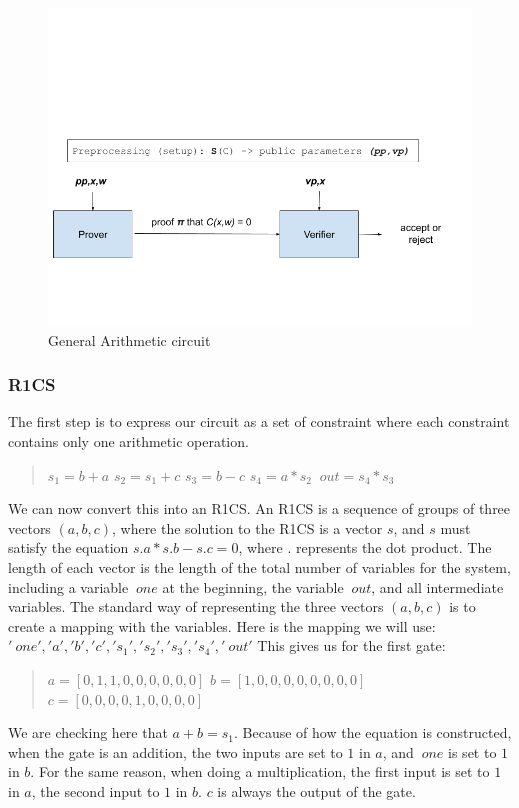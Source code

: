 \begin{figure}[H]
   \centering
   \includegraphics[width=130mm]{ArithmeticCircuit.png}
   \caption{General Arithmetic circuit}
   \label{overflow}
   \end{figure}

   \subsubsection{R1CS}
   The first step is to express our circuit as a set of constraint where each constraint contains only one arithmetic operation.
   \begin{quote}
   $s_1 = b+a$
   $s_2 = s_1+c$
   $s_3 = b-c$
   $s_4 = a * s_2$
   $~out = s_4 * s_3$
   \end{quote}

   We can now convert this into an R1CS.
   An R1CS is a sequence of groups of three vectors $(a, b, c)$, where the solution to the R1CS is a vector $s$, and $s$ must satisfy the equation $s . a * s . b - s . c = 0$, where $.$ represents the dot product.
   The length of each vector is the length of the total number of variables for the system, including a variable $~one$ at the beginning, the variable $~out$, and all intermediate variables.
   The standard way of representing the three vectors $(a, b, c)$ is to create a mapping with the variables.
   Here is the mapping we will use:
   $'~one', 'a','b','c','s_1','s_2','s_3','s_4', '~out'$
   This gives us for the first gate:
   \begin{quote}
      $a = [0,1,1,0,0,0,0,0,0]$
      $b = [1,0,0,0,0,0,0,0,0]$
      $c = [0,0,0,0,1,0,0,0,0]$
   \end{quote}
   We are checking here that $a+b=s_1$.
   Because of how the equation is constructed, when the gate is an addition, the two inputs are set to $1$ in $a$, and $~one$ is set to $1$ in $b$.
   For the same reason, when doing a multiplication, the first input is set to $1$ in $a$, the second input to $1$ in $b$.
   $c$ is always the output of the gate.

